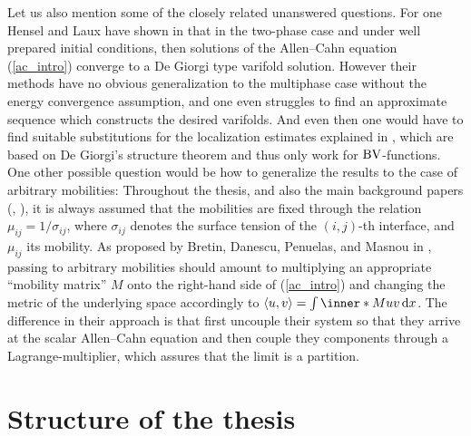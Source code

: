 Let us also mention some of the closely related unanswered questions. For one 
Hensel and Laux have shown in 
\cite{hensel_laux_varifold_solution_concept_for_mean_curvature_flow}
that in the two-phase case and under well prepared initial conditions, then 
solutions of the Allen--Cahn equation (\ref{ac_intro}) converge to a De Giorgi 
type varifold solution. However their methods have no obvious generalization to 
the multiphase case without the energy convergence assumption, and one even 
struggles to find an approximate sequence 
which constructs the desired varifolds. And even then one would have to find 
suitable substitutions for the localization estimates explained in 
, which are based on De Giorgi's structure 
theorem and thus only work for $ \operatorname{BV} $-functions.
One other possible question would be how to generalize the results to the case 
of 
arbitrary mobilities: Throughout the thesis, and also the main background 
papers 
(\cite{convergence_of_allen_cahn_equation_to_multiphase_mean_curvature_flow},
\cite{hensel_laux_varifold_solution_concept_for_mean_curvature_flow}), it is 
always assumed that the mobilities are fixed through the relation $ \mu_{ i j } 
= 1/ \sigma_{ i j } $, where $ \sigma_{ i j } $ denotes the surface tension of 
the $ ( i , j ) $-th interface, and $ \mu_{ i j } $ its mobility. As proposed by
Bretin, Danescu, Penuelas, and Masnou in 
\cite{bretin_dansecu_penuelas_masnou_a_metric_based_approach_to_mmcf_with_mobilities},
passing
to arbitrary mobilities should 
amount to multiplying an appropriate \enquote{mobility matrix} $ M $ onto the 
right-hand side of (\ref{ac_intro}) and changing the metric of the underlying 
space accordingly to $ \langle u , v \rangle = \int \inner*{M u}{ v} \dd{ x } $.
The difference in their approach is that first uncouple their system so that 
they arrive at the scalar Allen--Cahn equation and then couple they components 
through a Lagrange-multiplier, which assures that the limit is a partition.

\section{Structure of the thesis}

